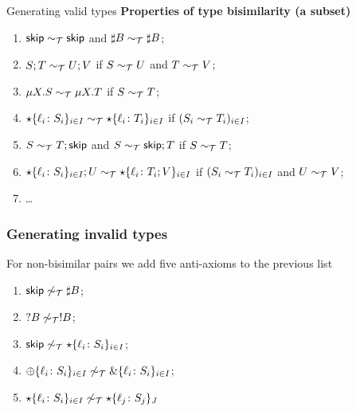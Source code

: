 \message{ !name(main.tex)}\documentclass[10pt]{beamer}
\begin{document}
\begin{frame}{Generating valid types}
\textbf{Properties of type bisimilarity (a subset)}
  \begin{enumerate} 
  \item $\mathsf{skip} \sim_\mathcal T \mathsf{skip}$ and $\sharp B \sim_\mathcal T \sharp B$;
  \item $S;T \sim_\mathcal T U;V$ if $S \sim_\mathcal T U$ and $T \sim_\mathcal T V$;
  \item $\mu X.S \sim_\mathcal T \mu X.T$ if $S \sim_\mathcal T T$;
  \item $\star\{\ell_i\colon S_i\}_{i\in I}\sim_\mathcal T
    \star\{\ell_i\colon T_i\}_{i\in I}$ if $(S_i \sim_\mathcal T T_i)_{i\in
      I}$;
  \item $S\sim_\mathcal T T;\mathsf{skip}$ and $S\sim_\mathcal T \mathsf{skip};T$ if $S \sim_\mathcal T T$;
  \item $\star\{\ell_i\colon S_i\}_{i\in I};U\sim_\mathcal T
    \star\{\ell_i\colon T_i;V\}_{i\in I}$ if $(S_i \sim_\mathcal T T_i)_{i\in
      I}$ and $U \sim_\mathcal T V$;
    \item \dots
  \end{enumerate}
  
\end{frame}

\begin{frame}
  \frametitle{Generating invalid types}
  For non-bisimilar pairs we add five anti-axioms to the previous list

  \begin{enumerate}
  \item $\mathsf{skip} \not\sim_\mathcal T \sharp B$;
  \item $?B \not\sim_\mathcal T !B$;
  \item $\mathsf{skip} \not\sim_\mathcal T \star\{\ell_i\colon S_i\}_{i\in I}$;
  \item $\oplus\{\ell_i\colon S_i\}_{i\in I} \not\sim_\mathcal T \&\{\ell_i\colon S_i\}_{i\in I}$;
  \item $\star\{\ell_i\colon S_i\}_{i\in I} \not\sim_\mathcal T \star\{\ell_j\colon S_j\}_J$
  \end{enumerate}
\end{frame}
\end{document}
